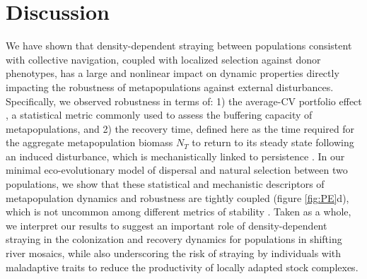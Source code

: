 \documentclass[twocolumn,preprintnumbers,amsmath,amssymb,superscriptaddress]{revtex4}
\begin{document}



\section{Discussion}

We have shown that density-dependent straying between populations consistent with collective navigation, coupled with localized selection against donor phenotypes, has a large and nonlinear impact on dynamic properties directly impacting the robustness of metapopulations against external disturbances.
Specifically, we observed robustness in terms of: 
1) the average-CV portfolio effect \cite{Anderson:2013gb,Anonymous:2015gf}, a statistical metric commonly used to assess the buffering capacity of metapopulations, and
2) the recovery time, defined here as the time required for the aggregate metapopulation biomass $N_T$ to return to its steady state following an induced disturbance, which is mechanistically linked to persistence \cite{Ovaskainen:2002il}.
In our minimal eco-evolutionary model of dispersal and natural selection between two populations, we show that these statistical and mechanistic descriptors of metapopulation dynamics and robustness are tightly coupled (figure \ref{fig:PE}d), which is not uncommon among different metrics of stability \cite{Donohue:2013iu}.
Taken as a whole, we interpret our results to suggest an important role of density-dependent straying in the colonization and recovery dynamics for populations in shifting river mosaics, while also underscoring the risk of straying by individuals with maladaptive traits to reduce the productivity of locally adapted stock complexes.
\end{document}
